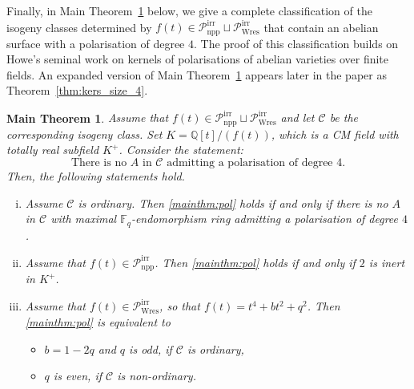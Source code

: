 \documentclass[11pt]{amsart}
\newcommand\Fq{\mathbb{F}_q}
\newcommand\Q{\mathbb{Q}}
\newcommand\cC{\mathcal{C}}
\theoremstyle{plain}
\newtheorem{maintheorem}{Main Theorem}
\theoremstyle{definition}
\newcommand\PirrA{\mathcal{P}^\mathrm{irr}_\mathrm{npp}}
\newcommand\PirrB{\mathcal{P}^\mathrm{irr}_\mathrm{Wres}}
\begin{document}
Finally, in Main Theorem~\ref{mainthm2} below, we give a complete classification of the isogeny classes determined by $f(t)\in \PirrA\sqcup\PirrB$ that contain an abelian surface with a polarisation of degree $4$.
The proof of this classification builds on Howe's seminal work \cite{Howe95,Howe96} on kernels of polarisations of abelian varieties over finite fields.
An expanded version of Main Theorem~\ref{mainthm2} appears later in the paper as Theorem~\ref{thm:kers_size_4}.
\begin{maintheorem}\label{mainthm2}
    Assume that $f(t)\in\PirrA\sqcup\PirrB$ and let $\cC$ be the corresponding isogeny class. 
    Set $K=\Q[t]/(f(t))$, which is a CM field with totally real subfield $K^+$. 
    Consider the statement:
    \begin{equation}\label{mainthm:pol}
    \text{There is no } A \text{ in } \cC \text{ admitting a polarisation of degree 4.} \tag{$\bigstar$}
    \end{equation}
    Then, the following statements hold.
    \begin{enumerate}[(i)]
        \item \label{mainthm:ord}
            Assume $\cC$ is ordinary. Then \eqref{mainthm:pol} holds if and only if there is no $A$ in $\cC$ with maximal $\Fq$-endomorphism ring admitting a polarisation of degree $4$.
        \item \label{mainthm:kers_size_4:A}
            Assume that $f(t)\in\PirrA$.
            Then \eqref{mainthm:pol} holds if and only if $2$ is inert in $K^+$.
        \item \label{mainthm:kers_size_4:B}
            Assume that $f(t)\in \PirrB$, so that $f(t)=t^4+bt^2+q^2$. 
            Then \eqref{mainthm:pol} is equivalent to 
            \begin{itemize}
            \item $b=1-2q$ and $q$ is odd, if $\cC$ is ordinary,
            \item $q$ is even, if $\cC$ is non-ordinary.
            \end{itemize}
    \end{enumerate}
\end{maintheorem}
\end{document}
